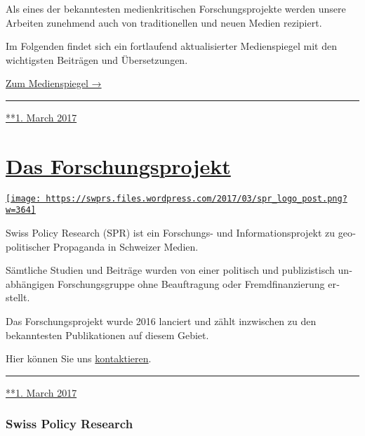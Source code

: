Als eines der bekanntesten medien­kritischen Forschungs­projekte werden
unsere Arbeiten zunehmend auch von tradi­tio­nellen und neuen Medien
rezipiert.

Im Folgenden findet sich ein fort­laufend aktuali­sierter Medien­spiegel
mit den wich­tig­sten Beiträgen und Übersetzungen.

\href{https://swprs.org/medienspiegel/}{Zum Medienspiegel →}

\begin{center}\rule{0.5\linewidth}{\linethickness}\end{center}

\href{https://swprs.org/2017/03/01/medienspiegel/}{**1. March 2017}

\hypertarget{das-forschungsprojekt}{%
\section{\texorpdfstring{\href{https://swprs.org/2017/03/01/das-forschungsprojekt/}{Das
Forschungsprojekt}}{Das Forschungsprojekt}}\label{das-forschungsprojekt}}

\href{https://swprs.org/2017/03/01/das-forschungsprojekt/}{\texttt{[image: https://swprs.files.wordpress.com/2017/03/spr\_logo\_post.png?w=364]}}

Swiss Policy Research (SPR) ist ein Forschungs- und
Infor­ma­tions­projekt zu geo­po­li­tischer Pro­pa­ganda in Schweizer
Medien.

Sämtliche Studien und Bei­träge wurden von einer po­li­tisch und
pu­bli­zis­tisch un­ab­hän­gigen For­schungs­gruppe ohne Beauf­tra­gung
oder Fremd­finan­zierung er­­stellt.

Das Forschungsprojekt wurde 2016 lanciert und zählt inzwischen zu den
bekanntesten Publi­ka­tionen auf diesem Gebiet.

Hier können Sie uns \href{https://swprs.org/kontakt/}{kon­­tak­tieren}.

\begin{center}\rule{0.5\linewidth}{\linethickness}\end{center}

\href{https://swprs.org/2017/03/01/das-forschungsprojekt/}{**1. March
2017}

\hypertarget{swiss-policy-research}{%
\subsubsection{Swiss Policy Research}\label{swiss-policy-research}}

